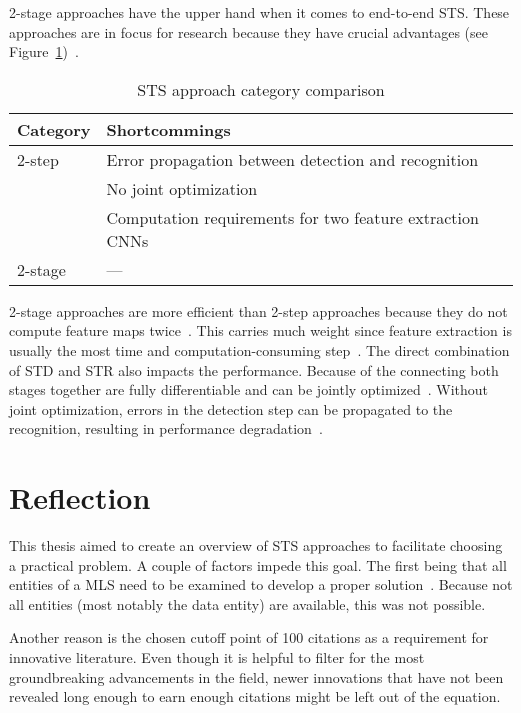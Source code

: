 2-stage approaches have the upper hand when it comes to end-to-end \ac{STS}.
These approaches are in focus for research because they have crucial
advantages (see Figure~\ref{tb:E2E-comparison})~\citep{chen_text_2021}.
\begin{table}[h]
    \centering\scriptsize%
    \begin{tabular}{p{}p{}}
        \textbf{Category} & \textbf{Shortcommings} \\
        \toprule
        2-step & Error propagation between detection and
            recognition~\citep{chen_text_2021,long_scene_2021}\\
        & No joint optimization~\citep{qiao_text_2021, chen_text_2021}\\
        & Computation requirements for two feature extraction
            CNNs~\citep{liu_fots_2018,chen_text_2021} \\
        2-stage & --- \\
        \bottomrule
    \end{tabular}
    \caption{STS approach category comparison\label{tb:E2E-comparison}}
\end{table}
2-stage approaches are more efficient than 2-step approaches because they do not compute feature maps
twice~\citep{liu_fots_2018,chen_text_2021}.
This carries much weight since feature extraction is usually the most time and
computation-consuming step~\citep{liu_fots_2018}.
The direct combination of \ac{STD} and \ac{STR} also impacts the performance.
Because of the connecting both stages together are fully differentiable and can be jointly
optimized~\citep{chen_text_2021,long_scene_2021,qiao_text_2021}.
Without joint optimization, errors in the detection step can be propagated to the
recognition, resulting in performance degradation~\citep{chen_text_2021,qiao_text_2021}.

\section{Reflection}
This thesis aimed to create an overview of \ac{STS} approaches to facilitate
choosing a practical problem.
A couple of factors impede this goal.
The first being that all entities of a \ac{MLS} need to be examined to develop a proper
solution~\citep{siebert_construction_2021,nakamichi_requirements-driven_2020}.
Because not all entities (most notably the data entity) are available, this was not possible.

Another reason is the chosen cutoff point of 100 citations as a requirement for innovative literature.
Even though it is helpful to filter for the most groundbreaking advancements in the field,
newer innovations that have not been revealed long enough to earn enough citations might be left
out of the equation.

